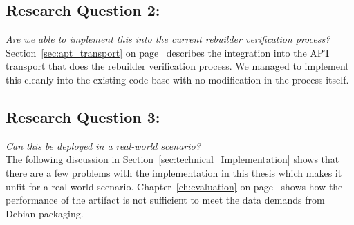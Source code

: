 \documentclass[../Main/thesis.tex]{subfiles}
\begin{document}
\subsection*{Research Question 2:}%
\label{sub:research_question_2_}
\textit{Are we able to implement this into the current rebuilder verification
process?}\\
Section~\ref{sec:apt_transport} on page~\pageref{sec:apt_transport} describes
the integration into the APT transport that does the rebuilder verification
process. We managed to implement this cleanly into the existing code base with
no modification in the process itself.

\subsection*{Research Question 3:}%
\label{sub:research_question_3_}
\textit{Can this be deployed in a real-world scenario?}\\
The following discussion in Section~\ref{sec:technical_Implementation} shows
that there are a few problems with the implementation in this thesis which makes
it unfit for a real-world scenario. Chapter~\ref{ch:evaluation} on
page~\pageref{ch:evaluation} shows how the performance of the artifact is not
sufficient to meet the data demands from Debian packaging.

\blankpage
\end{document}

